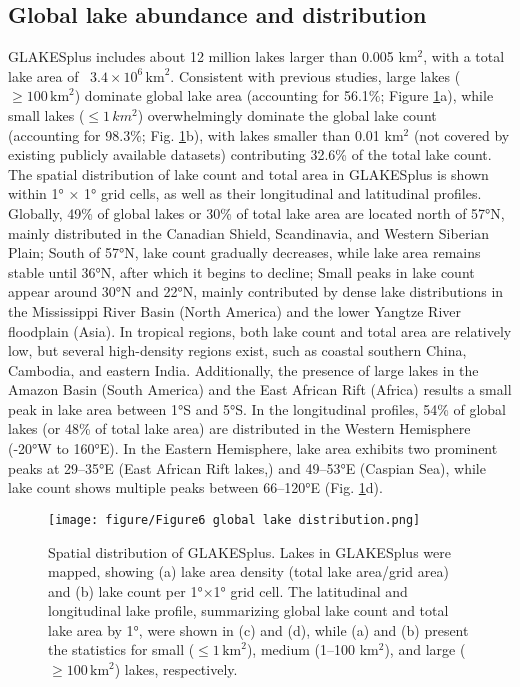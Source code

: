 \documentclass[preprint,12pt,authoryear]{elsarticle}
\begin{document}
\subsection{Global lake abundance and distribution}
\label{subsec32}

GLAKESplus includes about 12 million lakes larger than 0.005 km$^2$, with a total lake area of ~$3.4 \times 10^6\, \text{km}^2$. Consistent with previous studies, large lakes ($\ge 100\, \text{km}^2$) dominate global lake area (accounting for 56.1\%; Figure \ref{fig:Fig6}a), while small lakes ($\le 1\, km^2$) overwhelmingly dominate the global lake count (accounting for 98.3\%; Fig. \ref{fig:Fig6}b), with lakes smaller than 0.01 km$^2$ (not covered by existing publicly available datasets) contributing 32.6\% of the total lake count. The spatial distribution of lake count and total area in GLAKESplus is shown within 1° × 1° grid cells, as well as their longitudinal and latitudinal profiles. Globally, 49\% of global lakes or 30\% of total lake area are located north of 57°N, mainly distributed in the Canadian Shield, Scandinavia, and Western Siberian Plain; South of 57°N, lake count gradually decreases, while lake area remains stable until 36°N, after which it begins to decline; Small peaks in lake count appear around 30°N and 22°N, mainly contributed by dense lake distributions in the Mississippi River Basin (North America) and the lower Yangtze River floodplain (Asia). In tropical regions, both lake count and total area are relatively low, but several high-density regions exist, such as coastal southern China, Cambodia, and eastern India. Additionally, the presence of large lakes in the Amazon Basin (South America) and the East African Rift (Africa) results a small peak in lake area between 1°S and 5°S. In the longitudinal profiles, 54\% of global lakes (or 48\% of total lake area) are distributed in the Western Hemisphere (-20°W to 160°E). In the Eastern Hemisphere, lake area exhibits two prominent peaks at 29–35°E (East African Rift lakes,) and 49–53°E (Caspian Sea), while lake count shows multiple peaks between 66–120°E (Fig. \ref{fig:Fig6}d).

\begin{figure}[h]
    \centering
    \texttt{[image: figure/Figure6 global lake distribution.png]}
    \caption{Spatial distribution of GLAKESplus. Lakes in GLAKESplus were mapped, showing (a) lake area density (total lake area/grid area) and (b) lake count per 1°×1° grid cell. The latitudinal and longitudinal lake profile, summarizing global lake count and total lake area by 1°, were shown in (c) and (d), while (a) and (b) present the statistics for small ($\le 1 \,\text{km}^2$), medium (1–100 km$^2$), and large ($\ge 100 \,\text{km}^2$) lakes, respectively.}
    \label{fig:Fig6}
\end{figure}
\end{document}
